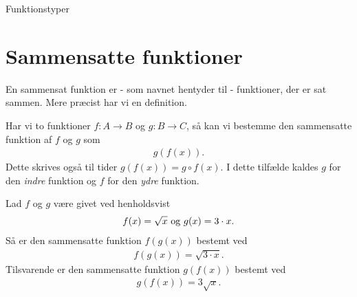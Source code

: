 
\begin{center}
\Huge
Funktionstyper 
\end{center}
\section*{Sammensatte funktioner}
En sammensat funktion er - som navnet hentyder til - funktioner, der er sat sammen. Mere præcist har vi en definition.
\begin{defn}
Har vi to funktioner $f:A \to B$ og $g:B \to C$, så kan vi bestemme  den sammensatte funktion af $f$ og $g$ som
\begin{align*}
g(f(x)).
\end{align*}
Dette skrives også til tider $g(f(x))= g\circ f(x)$. I dette tilfælde kaldes $g$ for den \textit{indre} funktion og $f$ for den \textit{ydre} funktion.
\end{defn}
\begin{figure}[H]
	\centering
\end{figure}
\begin{exa}
Lad $f$ og $g$ være givet ved henholdsvist
\begin{align*}
f(x) = \sqrt{x} \textnormal{ og }g(x) = 3\cdot x.
\end{align*}
Så er den sammensatte funktion $f(g(x))$ bestemt ved
\begin{align*}
f(g(x)) = \sqrt{3\cdot x}.
\end{align*}
Tilsvarende er den sammensatte funktion $g(f(x))$ bestemt ved
\begin{align*}
g(f(x)) = 3\sqrt{x}.
\end{align*}
\end{exa}
